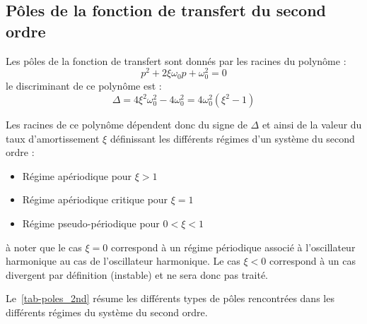 \subsection{Pôles de la fonction de transfert du second ordre}
Les pôles de la fonction de transfert sont donnés par les racines du polynôme :
$$
p^2+2\xi\omega_0p+\omega_0^2 = 0
$$
le discriminant de ce polynôme est :
$$
\Delta=4\xi^2\omega^2_0-4\omega_0^2=4\omega_0^2(\xi^2-1)
$$

Les racines de ce polynôme dépendent donc du signe de $\Delta$ et ainsi de la valeur 
du taux d'amortissement $\xi$ définissant les différents régimes d'un système du second ordre :
\begin{itemize}
    \item Régime apériodique pour $\xi>1$
    \item Régime apériodique critique pour $\xi=1$
    \item Régime pseudo-périodique pour $0<\xi<1$
\end{itemize}
à noter que le cas $\xi=0$ correspond à un régime périodique associé à l'oscillateur harmonique 
au cas de l'oscillateur harmonique.
Le cas $\xi<0$ correspond à un cas divergent par définition (instable) et ne sera donc pas traité.

Le~\cref{tab-poles_2nd} résume les différents types de pôles rencontrées dans les différents régimes
du système du second ordre.


